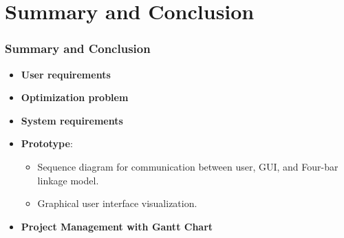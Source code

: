 \documentclass[ucs,10pt]{beamer}
\begin{document}
\section{Summary and Conclusion}

\begin{frame}
\frametitle{Summary and Conclusion}
    \begin{itemize}
        \item \textbf{User requirements}
        \item \textbf{Optimization problem}
        \item \textbf{System requirements}
        \item \textbf{Prototype}:
        \begin{itemize}
            \item Sequence diagram for communication between user, GUI, and Four-bar linkage model.
            \item Graphical user interface visualization.
        \end{itemize}
        \item \textbf{Project Management with Gantt Chart}
    \end{itemize}
\end{frame}
\end{document}
